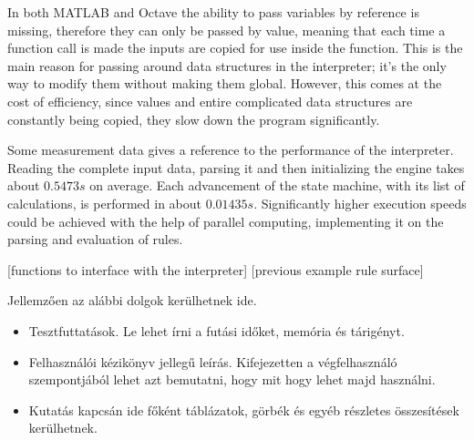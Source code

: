In both MATLAB and Octave the ability to pass variables by reference is missing, therefore they can only be passed by value, meaning that each time a function call is made the inputs are copied for use inside the function. This is the main reason for passing around data structures in the interpreter; it's the only way to modify them without making them global. However, this comes at the cost of efficiency, since values and entire complicated data structures are constantly being copied, they slow down the program significantly.

Some measurement data gives a reference to the performance of the interpreter. Reading the complete input data, parsing it and then initializing the engine takes about $0.5473s$ on average. Each advancement of the state machine, with its list of calculations, is performed in about $0.01435s$. Significantly higher execution speeds could be achieved with the help of parallel computing, implementing it on the parsing and evaluation of rules.

[functions to interface with the interpreter]
[previous example rule surface]

Jellemzően az alábbi dolgok kerülhetnek ide.
\begin{itemize}
\item Tesztfuttatások. Le lehet írni a futási időket, memória és tárigényt.
\item Felhasználói kézikönyv jellegű leírás. Kifejezetten a végfelhasználó szempontjából lehet azt bemutatni, hogy mit hogy lehet majd használni.
\item Kutatás kapcsán ide főként táblázatok, görbék és egyéb részletes összesítések kerülhetnek.
\end{itemize}
